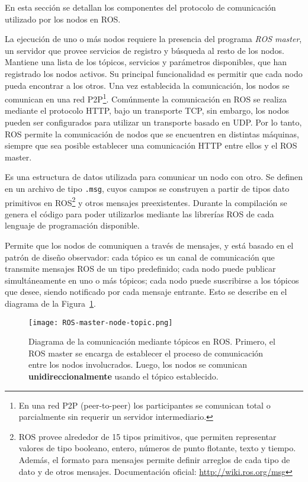 En esta sección se detallan los componentes del protocolo de comunicación utilizado por los nodos en ROS.

 La ejecución de uno o más nodos requiere la presencia del programa \textit{ROS master}, un servidor que provee servicios de registro y búsqueda al resto de los nodos. Mantiene una lista de los tópicos, servicios y parámetros disponibles, que han registrado los nodos activos. Su principal funcionalidad es permitir que cada nodo pueda encontrar a los otros. Una vez establecida la comunicación, los nodos se comunican en una red P2P\footnote{En una red P2P (peer-to-peer) los participantes se comunican total o parcialmente sin requerir un servidor intermediario.}. Comúnmente la comunicación en ROS se realiza mediante el protocolo HTTP, bajo un transporte TCP, sin embargo, los nodos pueden ser configurados para utilizar un transporte basado en UDP. Por lo tanto, ROS permite la comunicación de nodos que se encuentren en distintas máquinas, siempre que sea posible establecer una comunicación HTTP entre ellos y el ROS master.

 Es una estructura de datos utilizada para comunicar un nodo con otro. Se definen en un archivo de tipo \texttt{.msg}, cuyos campos se construyen a partir de tipos dato primitivos en ROS\footnote{ROS provee alrededor de 15 tipos primitivos, que permiten representar valores de tipo booleano, entero, números de punto flotante, texto y tiempo. Además, el formato para mensajes permite definir arreglos de cada tipo de dato y de otros mensajes. Documentación oficial: \url{http://wiki.ros.org/msg}} y otros mensajes preexistentes. Durante la compilación se genera el código para poder utilizarlos mediante las librerías ROS de cada lenguaje de programación disponible.

 Permite que los nodos de comuniquen a través de mensajes, y está basado en el patrón de diseño observador: cada tópico es un canal de comunicación que transmite mensajes ROS de un tipo predefinido; cada nodo puede publicar simultáneamente en uno o más tópicos; cada nodo puede suscribirse a los tópicos que desee, siendo notificado por cada mensaje entrante. Esto se describe en el diagrama de la Figura~\ref{img:ros-topic}.

\begin{figure}[!ht]
	\centering
	\texttt{[image: ROS-master-node-topic.png]}
	\caption[Comunicación mediante tópicos en ROS.]
	{\small Diagrama de la comunicación mediante tópicos en ROS. Primero, el ROS master se encarga de establecer el proceso de comunicación entre los nodos involucrados. Luego, los nodos se comunican {\bfseries unidireccionalmente} usando el tópico establecido.}
	\label{img:ros-topic}
\end{figure}

